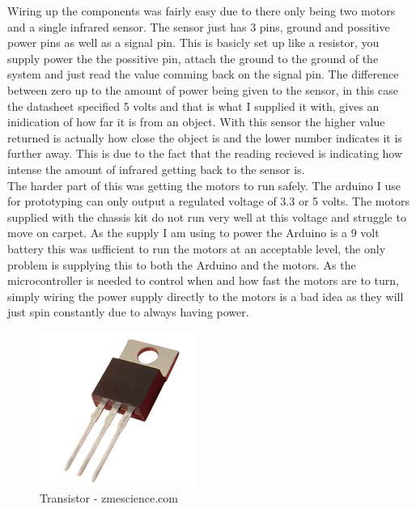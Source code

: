 Wiring up the components was fairly easy due to there only being two motors and a single infrared sensor.  The sensor just has 3 pins, ground and possitive power pins as well as a signal pin.  This is basicly set up like a resistor, you supply power the the possitive pin, attach the ground to the ground of the system and just read the value comming back on the signal pin.  The difference between zero up to the amount of power being given to the sensor, in this case the datasheet specified 5 volts and that is what I supplied it with, gives an inidication of how far it is from an object.  With this sensor the higher value returned is actually how close the object is and the lower number indicates it is further away.  This is due to the fact that the reading recieved is indicating how intense the amount of infrared getting back to the sensor is.
\\The harder part of this was getting the motors to run safely.  The arduino I use for prototyping can only output a regulated voltage of 3.3 or 5 volts.  The motors supplied with the chassis kit do not run very well at this voltage and struggle to move on carpet.  As the supply I am using to power the Arduino is a 9 volt battery this was usfficient to run the motors at an acceptable level, the only problem is supplying this to both the Arduino and the motors.  As the microcontroller is needed to control when and how fast the motors are to turn, simply wiring the power supply directly to the motors is a bad idea as they will just spin constantly due to always having power.
\begin{figure}[h]
\centering
        \includegraphics[width=2.0in] {Images/transistor.jpg}
        \caption{Transistor - zmescience.com}
        \label{Transistor}
\end{figure}

